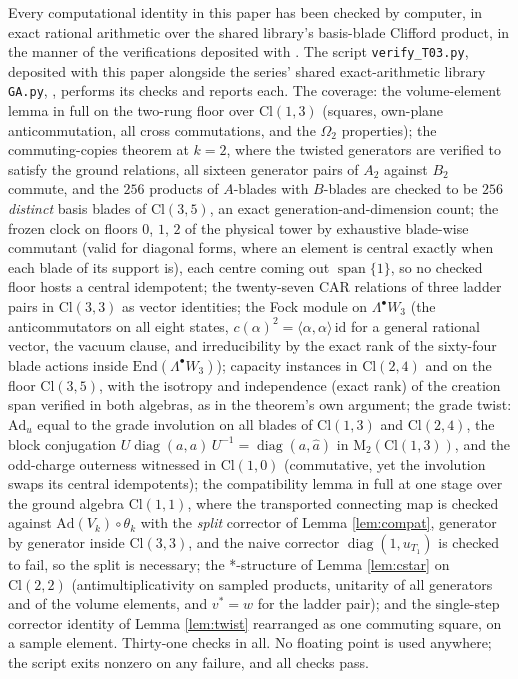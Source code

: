 \documentclass[11pt]{article}
\theoremstyle{definition}
\newcommand{\Cl}{\mathrm{Cl}}
\newcommand{\Mat}{\mathrm{M}}
\newcommand{\End}{\mathrm{End}}
\newcommand{\Ad}{\mathrm{Ad}}
\begin{document}
Every computational identity in this paper has been checked by computer, in exact rational arithmetic over the shared library's basis-blade Clifford product, in the manner of the verifications deposited with \cite{ButlerT1, ButlerT4}. The script \texttt{verify\_T03.py}, deposited with this paper alongside the series' shared exact-arithmetic library \texttt{GA.py}, \cite{ButlerVerifyT03}, performs its checks and reports each. The coverage: the volume-element lemma in full on the two-rung floor over $\Cl(1,3)$ (squares, own-plane anticommutation, all cross commutations, and the $\Omega_2$ properties); the commuting-copies theorem at $k = 2$, where the twisted generators are verified to satisfy the ground relations, all sixteen generator pairs of $A_2$ against $B_2$ commute, and the $256$ products of $A$-blades with $B$-blades are checked to be $256$ \emph{distinct} basis blades of $\Cl(3,5)$, an exact generation-and-dimension count; the frozen clock on floors $0$, $1$, $2$ of the physical tower by exhaustive blade-wise commutant (valid for diagonal forms, where an element is central exactly when each blade of its support is), each centre coming out $\operatorname{span}\{1\}$, so no checked floor hosts a central idempotent; the twenty-seven CAR relations of three ladder pairs in $\Cl(3,3)$ as vector identities; the Fock module on $\Lambda^\bullet W_3$ (the anticommutators on all eight states, $c(\alpha)^2 = \langle\alpha,\alpha\rangle\,\mathrm{id}$ for a general rational vector, the vacuum clause, and irreducibility by the exact rank of the sixty-four blade actions inside $\End(\Lambda^\bullet W_3)$); capacity instances in $\Cl(2,4)$ and on the floor $\Cl(3,5)$, with the isotropy and independence (exact rank) of the creation span verified in both algebras, as in the theorem's own argument; the grade twist: $\Ad_u$ equal to the grade involution on all blades of $\Cl(1,3)$ and $\Cl(2,4)$, the block conjugation $U \operatorname{diag}(a,a)\,U^{-1} = \operatorname{diag}(a, \hat a)$ in $\Mat_2(\Cl(1,3))$, and the odd-charge outerness witnessed in $\Cl(1,0)$ (commutative, yet the involution swaps its central idempotents); the compatibility lemma in full at one stage over the ground algebra $\Cl(1,1)$, where the transported connecting map is checked against $\Ad(V_k) \circ \theta_k$ with the \emph{split} corrector of Lemma \ref{lem:compat}, generator by generator inside $\Cl(3,3)$, and the naive corrector $\operatorname{diag}(1, u_{T_1})$ is checked to fail, so the split is necessary; the *-structure of Lemma \ref{lem:cstar} on $\Cl(2,2)$ (antimultiplicativity on sampled products, unitarity of all generators and of the volume elements, and $v^* = w$ for the ladder pair); and the single-step corrector identity of Lemma \ref{lem:twist} rearranged as one commuting square, on a sample element. Thirty-one checks in all. No floating point is used anywhere; the script exits nonzero on any failure, and all checks pass.
\end{document}
